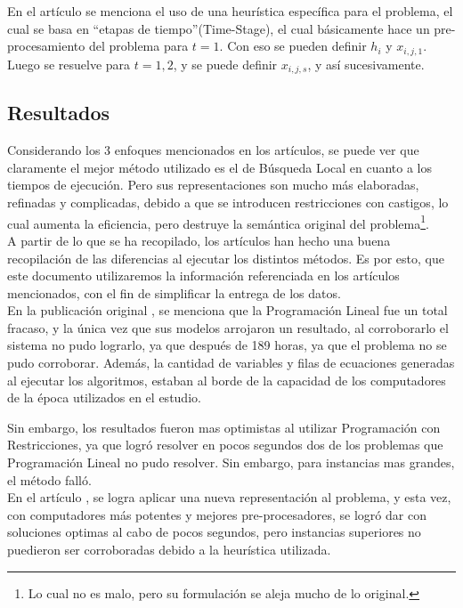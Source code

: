 \documentclass[letter, 10pt]{article}
\begin{document}
En el artículo \cite{PPPAsMIP} se menciona el uso de una heurística específica para el problema, el cual se basa en ``etapas de tiempo''(Time-Stage), el cual básicamente hace un pre-procesamiento del problema para $t=1$. Con eso se pueden definir $h_i$ y $x_{i,j,1}$. Luego se resuelve para $t=1,2$, y se puede definir $x_{i,j,s}$, y así sucesivamente.


\subsection{Resultados}
Considerando los 3 enfoques mencionados en los artículos, se puede ver que claramente el mejor método utilizado es el de Búsqueda Local en cuanto a los tiempos de ejecución. Pero sus representaciones son mucho más elaboradas, refinadas y complicadas, debido a que se introducen restricciones con castigos, lo cual aumenta la eficiencia, pero destruye la semántica original del problema\footnote{Lo cual no es malo, pero su formulación se aleja mucho de lo original.}.\\

A partir de lo que se ha recopilado, los artículos \cite{LocalSearch, PPPAsMIP} han hecho una buena recopilación de las diferencias al ejecutar los distintos métodos. Es por esto, que este documento utilizaremos la información referenciada en los artículos mencionados, con el fin de simplificar la entrega de los datos.\\

En la publicación original \cite{FirstPublication}, se menciona que la Programación Lineal fue un total fracaso, y la única vez que sus modelos arrojaron un resultado, al corroborarlo el sistema no pudo lograrlo, ya que después de 189 horas, ya que el problema no se pudo corroborar. Además, la cantidad de variables y filas de ecuaciones generadas al ejecutar los algoritmos, estaban al borde de la capacidad de los computadores de la época utilizados en el estudio.

Sin embargo, los resultados fueron mas optimistas al utilizar Programación con Restricciones, ya que logró resolver en pocos segundos dos de los problemas que Programación Lineal no pudo resolver. Sin embargo, para instancias mas grandes, el método falló.\\

En el artículo \cite{PPPAsMIP}, se logra aplicar una nueva representación al problema, y esta vez, con computadores más potentes y mejores pre-procesadores, se logró dar con soluciones optimas al cabo de pocos segundos, pero instancias superiores no puedieron ser corroboradas debido a la heurística utilizada.
\end{document}
